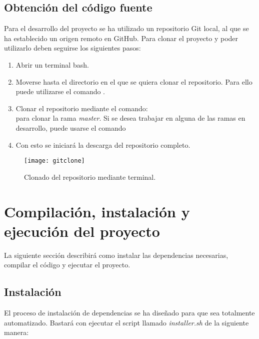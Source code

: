 \subsection{Obtención del código fuente}

Para el desarrollo del proyecto se ha utilizado un repositorio Git local, al que se ha establecido un origen remoto en GitHub. Para clonar el proyecto y poder utilizarlo deben seguirse los siguientes pasos:

\begin{enumerate}
\item Abrir un terminal bash. 
\item Moverse hasta el directorio en el que se quiera clonar el repositorio. Para ello puede utilizarse el comando .
\item Clonar el repositorio mediante el comando:\\  para clonar la rama \emph{master}. Si se desea trabajar en alguna de las ramas en desarrollo, puede usarse el comando\\ 
\item Con esto se iniciará la descarga del repositorio completo.
\end{enumerate}

\begin{figure}[H]
	\centering
	\texttt{[image: gitclone]}
	\caption[Clonado de repositorio Git]{Clonado del repositorio mediante terminal.}\label{fig:gitclone}
\end{figure}

\section{Compilación, instalación y ejecución del proyecto}
La siguiente sección describirá como instalar las dependencias necesarias, compilar el código y ejecutar el proyecto.

\subsection{Instalación}
\label{subsec:installersh}

El proceso de instalación de dependencias se ha diseñado para que sea totalmente automatizado. 
Bastará con ejecutar el script llamado \emph{installer.sh} de la siguiente manera: 

